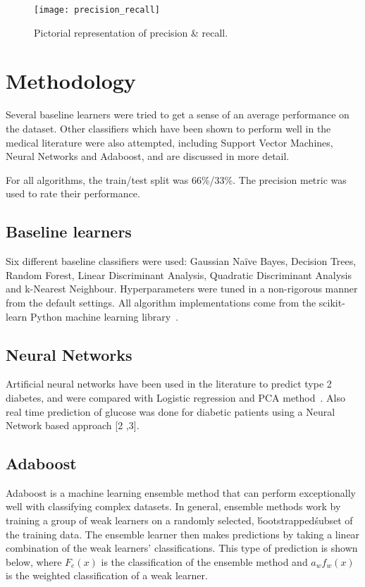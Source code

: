 \documentclass[conference]{IEEEtran}
\begin{document}
\begin{figure}[htpb]
	\centering
	\texttt{[image: precision\_recall]}
	\caption{Pictorial representation of precision \& recall.}
	\label{fig:precision_recall}
\end{figure}

\section{Methodology}

Several baseline learners were tried to get a sense of an average performance on the dataset. Other classifiers which have been shown to perform well in the medical literature were also attempted, including Support Vector Machines, Neural Networks and Adaboost, and are discussed in more detail.

For all algorithms, the train/test split was 66\%/33\%. The precision metric was used to rate their performance.

\subsection{Baseline learners}

Six different baseline classifiers were used: Gaussian Naïve Bayes, Decision Trees, Random Forest, Linear Discriminant Analysis, Quadratic Discriminant Analysis and k-Nearest Neighbour. Hyperparameters were tuned in a non-rigorous manner from the default settings. All algorithm implementations come from the scikit-learn Python machine learning library~\cite{scikit-learn}.

\subsection{Neural Networks}

Artificial neural networks have been used in the literature to predict type 2 diabetes, and were compared with Logistic regression and PCA method~\cite{}. Also real time prediction of glucose was done for diabetic patients using a Neural Network based approach [2 ,3]. 

\subsection{Adaboost}
Adaboost is a machine learning ensemble method that can perform exceptionally well with classifying complex datasets. In general, ensemble methods work by training a group of weak learners on a randomly selected, \'bootstrapped\' subset of the training data. The ensemble learner then makes predictions by taking a linear combination of the weak learners' classifications. This type of prediction is shown below, where $F_{e}(x)$ is the classification of the ensemble method and $a_{w}f_{w}(x)$ is the weighted classification of a weak learner.
\end{document}

